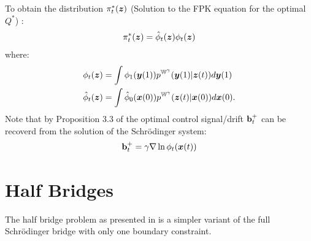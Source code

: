 \documentclass[a4paper,12pt,twoside,openright]{report}
\theoremstyle{definition}
\begin{document}
To obtain the distribution $\pi^{*}_t({\bm{z}})$ (Solution to the FPK equation for the optimal $Q^{*}$) :
\begin{align}
    \pi^{*}_t({\bm{z}}) =  {\hat{\phi}}_t({\bm{z}}) \phi_t({\bm{z}}) 
\end{align}
where:
\begin{align}
    \phi_t({\bm{z}}) &= \int \phi_1({\bm{y}}(1) ) p^{\mathbb{W}^{\gamma}}({\bm{y}}(1)|{\bm{z}}(t)) d{\bm{y}}(1) \nonumber\\ 
    {\hat{\phi}}_t({\bm{z}}) &= \int {\hat{\phi}}_0({\bm{x}}(0)) p^{\mathbb{W}^{\gamma}}({\bm{z}}(t)|{\bm{x}}(0)) d{\bm{x}}(0). \nonumber
\end{align}
Note that by Proposition 3.3 of \cite{pavon1991free} the optimal control signal/drift ${\mathbf{b}}_t^+$ can be recoverd from the solution of the Schrödinger system:
\begin{align} \label{eq:drifr_potential}
    {\mathbf{b}}_t^{+} = \gamma \nabla \ln \phi_t({\bm{x}}(t) )
\end{align}
\section{Half Bridges}

The half bridge problem as presented in \cite{pavon2018data} is a simpler variant of the full Schrödinger bridge with only one boundary constraint. 
\end{document}

